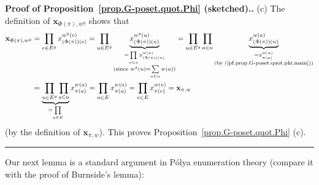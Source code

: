 \documentclass[numbers=enddot,12pt,final,onecolumn,notitlepage,abstracton]{scrartcl}%
\theoremstyle{definition}
\newenvironment{proof}[1][Proof]{\noindent\textbf{#1.} }{\ \rule{0.5em}{0.5em}}
\let\sumnonlimits\sum
\let\prodnonlimits\prod
\renewcommand{\sum}{\sumnonlimits\limits}
\renewcommand{\prod}{\prodnonlimits\limits}
\newcommand{\xx}{{\mathbf{x}}}
\begin{document}
\begin{proof}[Proof of Proposition~\ref{prop.G-poset.quot.Phi} (sketched).]
(c) 
The definition of $\xx_{\Phi\left(  \pi\right)  ,w^{g}}$ shows that
\begin{align*}
\xx_{\Phi\left(  \pi\right)  ,w^{g}}
&= \prod_{e\in E^{g}}
 x_{\left( \Phi\left(  \pi\right)  \right)  \left(  e\right)  }^{
    w^{g}\left(  e\right) }
= \prod_{u\in E^{g}}
 \underbrace{x_{\left(  \Phi\left(  \pi\right)  \right)
    \left(  u\right)  }^{w^{g}\left(  u\right)  }}_{
    \substack{=\prod_{a\in u}x_{\left(  \Phi\left(  \pi\right) 
    \right)  \left(  u\right)  }^{w\left( a\right)  }\\\text{(since }
    w^{g}\left(  u\right)  =\sum\limits_{a\in u}w\left(  a\right)
    \text{)}}}
= \prod_{u\in E^{g}} \prod_{a\in u}
  \underbrace{x_{\left(  \Phi\left(  \pi\right)  \right) 
    \left(  u\right) }^{w\left(  a\right)  }}_{
    \substack{=x_{\pi\left(  a\right)  }^{w\left( a\right)  }\\
    \text{(by (\ref{pf.prop.G-poset.quot.phi.main}))}}}\\
&= \underbrace{\prod_{u\in E^{g}}\prod_{a\in u}}_{=\prod_{a\in E}}
  x_{\pi\left(  a\right)  }^{w\left(  a\right)  }
=\prod_{a\in E}x_{\pi\left( a\right)  }^{w\left(  a\right)  }
=\prod_{e\in E}x_{\pi\left(  e\right) }^{w\left(  e\right)  }
=\xx_{\pi,w}%
\end{align*}
(by the definition of $\xx_{\pi,w}$). This proves
Proposition~\ref{prop.G-poset.quot.Phi} (c).
\end{proof}

Our next lemma is a standard argument in P\'olya enumeration theory (compare
it with the proof of Burnside's lemma):
\end{document}
